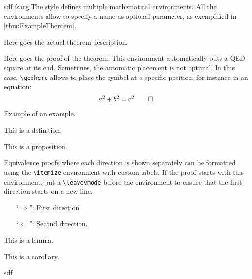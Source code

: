 sdf
fsarg
The style defines multiple mathematical environments. All the environments allow to specify a name as optional parameter, as exemplified in \cref{thm:ExampleTheroem}.
\begin{Thm}
\label{thm:ExampleTheroem}
Here goes the actual theorem description.
\end{Thm}
\begin{Proof}
Here goes the proof of the theorem. This environment automatically puts a QED square at its end. Sometimes, the automatic placement is not optimal. In this case, \texttt{\textbackslash qedhere} allows to place the symbol at a specific position, for instance in an equation:
\[a^2+b^2=c^2\qedhere\]
\end{Proof}
\begin{Exp}Example of an example.
\end{Exp}
\begin{Def}This is a definition.
\end{Def}
\begin{Prop}This is a proposition.
\end{Prop}
Equivalence proofs where each direction is shown separately can be formatted using the \texttt{\textbackslash itemize} environment with custom labels. If the proof starts with this environment, put a \texttt{\textbackslash leavevmode} before the environment to ensure that the first direction starts on a new line.
\begin{Proof}\leavevmode
\begin{itemize}[beginpenalty=10000,leftmargin=7ex]
\item[\enquote{$\Rightarrow$}:] First direction.
\item[\enquote{$\Leftarrow$}:] Second direction.\qedhere
\end{itemize}
\end{Proof}

\begin{Lem}This is a lemma.
\end{Lem}
\begin{Cor}This is a corollary.
\end{Cor}

\begin{procedure}
    sdf
\end{procedure}
\begin{problem}
    
\end{problem}